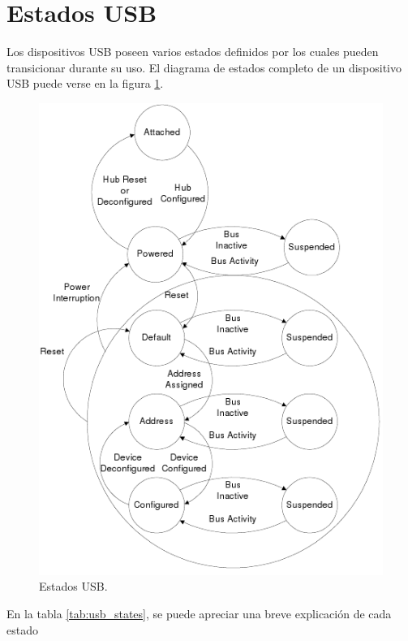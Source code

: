 \section{Estados USB}
Los dispositivos USB poseen varios estados definidos por los cuales pueden
transicionar durante su uso.
El diagrama de estados completo de un dispositivo USB puede verse en la figura
\ref{fig:usb_states}.


\begin{figure}[htp]
\centering
\includegraphics[scale=0.7]{./img/usb_states.png}
\caption{Estados USB.}
\label{fig:usb_states}
\end{figure}


En la tabla \ref{tab:usb_states}, se puede apreciar una breve explicaci\'on de
cada estado


